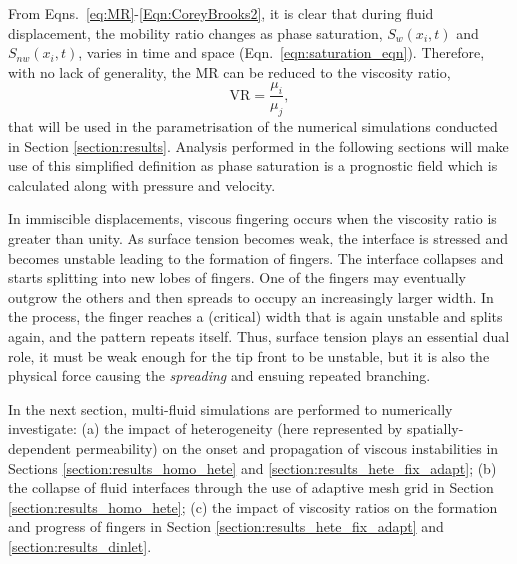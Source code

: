 \documentclass[preprint,authoryear,12pt]{elsarticle}
\newcommand{\frc}{\displaystyle\frac}
\begin{document}
\medskip
\noindent From Eqns.~\ref{eq:MR}-\ref{Eqn:CoreyBrooks2}, it is clear that during fluid displacement, the mobility ratio changes as phase saturation, $S_{w}\left(x_{i},t\right)$ and $S_{nw}\left(x_{i},t\right)$, varies in time and space (Eqn.~\ref{eqn:saturation_eqn}). Therefore, with no lack of generality, the MR can be reduced to the viscosity ratio,
\begin{displaymath}
    \text{VR} = \frc{\mu_{i}}{\mu_{j}},
\end{displaymath}
 that will be used in the parametrisation of the numerical simulations conducted in Section \ref{section:results}. Analysis performed in the following sections will make use of this simplified definition as phase saturation is a prognostic field which is calculated along with pressure and velocity.

\medskip
In immiscible displacements, viscous fingering occurs when the viscosity ratio is greater than unity. As surface tension becomes weak, the interface is stressed and becomes unstable leading to the formation of fingers. The interface collapses and starts splitting into new lobes of fingers. One of the fingers may eventually outgrow the others and then spreads to occupy an increasingly larger width. In the process, the finger reaches a (critical) width that is again unstable and splits again, and the pattern repeats itself. Thus, surface tension plays an essential dual role, it must be weak enough for the tip front to be unstable, but it is also the physical force causing the \textit{spreading} and ensuing repeated branching.

\medskip
In the next section, multi-fluid simulations are performed to numerically investigate: (a) the impact of heterogeneity (here represented by spatially-dependent permeability) on the onset and propagation of viscous instabilities in Sections \ref{section:results_homo_hete} and \ref{section:results_hete_fix_adapt}; (b) the collapse of fluid interfaces through the use of adaptive mesh grid in Section \ref{section:results_homo_hete}; (c) the impact of viscosity ratios on the formation and progress of fingers in Section \ref{section:results_hete_fix_adapt} and \ref{section:results_dinlet}.


\end{document}
